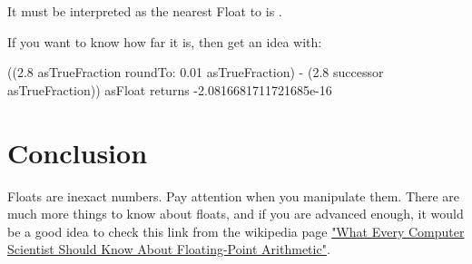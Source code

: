 \documentclass[a4paper,10pt,twoside]{book}
\begin{document}
It must be interpreted as the nearest Float to  is .

If you want to know how far it is, then get an idea with:

\begin{code}{}
((2.8 asTrueFraction roundTo: 0.01 asTrueFraction) - (2.8 successor asTrueFraction)) asFloat
	returns -2.0816681711721685e-16
\end{code}



\section{Conclusion}
Floats are inexact numbers. Pay attention when you manipulate them.
There are much more things to know about floats, and if you are advanced enough, it would be a good idea to check this link from the wikipedia page \href{http://www.validlab.com/goldberg/paper.pdf}{"What Every Computer Scientist Should Know About Floating-Point Arithmetic"}.


\ifx\wholebook\relax\else
   
   
\end{document}
